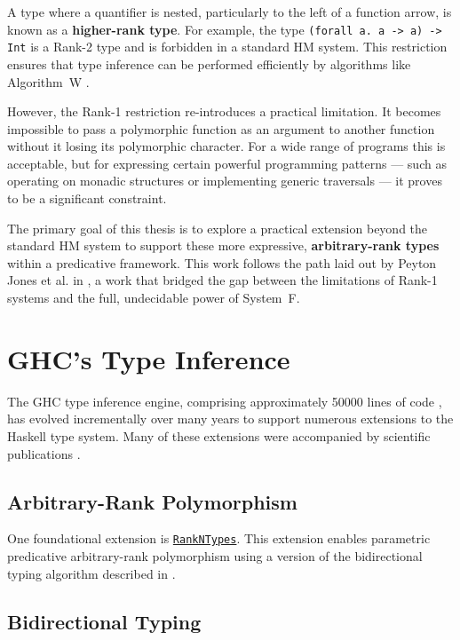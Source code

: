A type where a quantifier is nested, particularly to the left of a function arrow, is known as a \textbf{higher-rank type}. For example, the type \texttt{(forall a. a -> a) -> Int} is a Rank-2 type and is forbidden in a standard HM system. This restriction ensures that type inference can be performed efficiently by algorithms like Algorithm~W \cite{jones-practical-2007}.

However, the Rank-1 restriction re-introduces a practical limitation. It becomes impossible to pass a polymorphic function as an argument to another function without it losing its polymorphic character. For a wide range of programs this is acceptable, but for expressing certain powerful programming patterns --- such as operating on monadic structures or implementing generic traversals --- it proves to be a significant constraint.

The primary goal of this thesis is to explore a practical extension beyond the standard HM system to support these more expressive, \textbf{arbitrary-rank types} within a predicative framework. This work follows the path laid out by Peyton Jones et al. in \cite{jones-practical-2007}, a work that bridged the gap between the limitations of Rank-1 systems and the full, undecidable power of System~F.

\section{GHC's Type Inference}

The GHC type inference engine, comprising approximately 50000 lines of code \cite{jones-typechecker-2023}, has evolved incrementally over many years to support numerous extensions to the Haskell type system. Many of these extensions were accompanied by scientific publications \cite{haskell-type-systems-research}.

\subsection{Arbitrary-Rank Polymorphism}

One foundational extension is \href{https://gitlab.haskell.org/haskell/prime/-/wikis/RankNTypes}{\texttt{RankNTypes}}. This extension enables parametric predicative arbitrary-rank polymorphism using a version of the bidirectional typing algorithm described in \cite{jones-practical-2007}.

\subsection{Bidirectional Typing}


